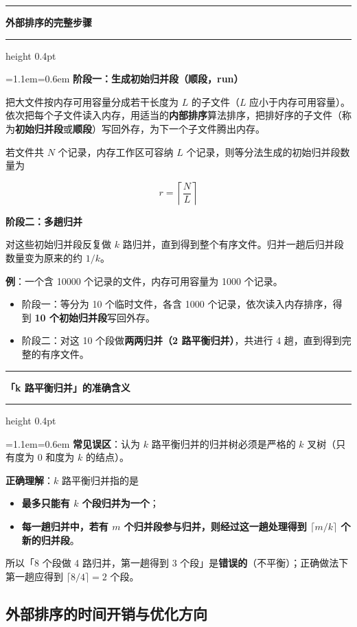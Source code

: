 \documentclass[11pt,openany,UTF8]{ctexbook}
\newcommand{\callouthead}[2]{%
  \par\addvspace{7pt}\noindent
  {\color{#1}\rule[-0.15em]{3pt}{1.05em}}\hspace{0.5em}%
  {\bfseries\color{#1}#2}\par\nobreak\vspace{-0.35em}%
  {\color{rulesep}\hrule height 0.4pt}\nobreak\vspace{0.45em}%
  \begingroup\small\setlength{\parindent}{0pt}%
  \leftskip=1.1em\rightskip=0.6em\noindent\ignorespaces}
\newcommand{\calloutend}{\par\endgroup\addvspace{7pt}}
\newenvironment{callkey}[1]{\callouthead{keybar}{#1}}{\calloutend}
\newenvironment{callwarn}[1]{\callouthead{warnbar}{#1}}{\calloutend}
\begin{document}
\begin{callkey}{外部排序的完整步骤}
\textbf{阶段一：生成初始归并段（顺段，run）}

把大文件按内存可用容量分成若干长度为 $L$ 的子文件（$L$ 应小于内存可用容量）。依次把每个子文件读入内存，用适当的\textbf{内部排序}算法排序，把排好序的子文件（称为\textbf{初始归并段}或\textbf{顺段}）写回外存，为下一个子文件腾出内存。

若文件共 $N$ 个记录，内存工作区可容纳 $L$ 个记录，则等分法生成的初始归并段数量为

\[r=\left\lceil\frac{N}{L}\right\rceil\]

\textbf{阶段二：多趟归并}

对这些初始归并段反复做 $k$ 路归并，直到得到整个有序文件。归并一趟后归并段数量变为原来的约 $1/k$。

\end{callkey}

\textbf{例}：一个含 10000 个记录的文件，内存可用容量为 1000 个记录。

\begin{itemize}
\item 阶段一：等分为 10 个临时文件，各含 1000 个记录，依次读入内存排序，得到 \textbf{10 个初始归并段}写回外存。
\item 阶段二：对这 10 个段做\textbf{两两归并（2 路平衡归并）}，共进行 4 趟，直到得到完整的有序文件。
\end{itemize}
\begin{callwarn}{「k 路平衡归并」的准确含义}
\textbf{常见误区}：认为 $k$ 路平衡归并的归并树必须是严格的 $k$ 叉树（只有度为 0 和度为 $k$ 的结点）。

\textbf{正确理解}：$k$ 路平衡归并指的是

\begin{itemize}
\item \textbf{最多只能有 $k$ 个段归并为一个}；
\item \textbf{每一趟归并中，若有 $m$ 个归并段参与归并，则经过这一趟处理得到 $\lceil m/k\rceil$ 个新的归并段}。
\end{itemize}
所以「8 个段做 4 路归并，第一趟得到 3 个段」是\textbf{错误的}（不平衡）；正确做法下第一趟应得到 $\lceil 8/4\rceil=2$ 个段。

\end{callwarn}

\subsection{外部排序的时间开销与优化方向}
\end{document}
